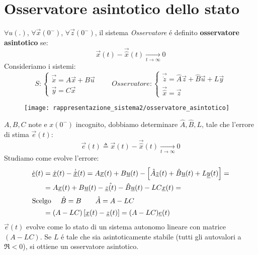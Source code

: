 \documentclass[../main.tex]{subfiles}
\begin{document}
	\section{Osservatore asintotico dello stato}
		$ \forall u(.) $, $ \forall \vec x(0^{-}) $, $ \forall \vec z(0^{-}) $, il sistema \textit{Osservatore} \'e definito \textbf{osservatore asintotico} se:
		\[
			\vec x(t) - \vec{\hat x}(t) \underset{t \rightarrow \infty}{\longrightarrow} 0
		\]
		Consideriamo i sistemi:
		\[
			S:
			\begin{cases}
				\vec{\dot x} = A \vec x + B \vec u\\
				\vec y = C \vec x
			\end{cases}
			\qquad
			Osservatore:
			\begin{cases}
				\vec{\dot z} = \hat A \vec z + \hat B \vec u + L \vec y\\
				\vec{\hat x} = \vec z
			\end{cases}
		\]
		
		\begin{figure}[H]
			\centering\texttt{[image: rappresentazione\_sistema2/osservatore\_asintotico]}
		\end{figure}
		
		$ A, B, C $ note e $ x(0^{-}) $ incognito, dobbiamo determinare $ \hat A, \hat B, L $, tale che l'errore di stima $ \vec e(t) $:
		\[
			\vec e(t) \triangleq \vec x(t) - \vec{\hat x}(t) \underset{t \rightarrow \infty}{\longrightarrow} 0
		\]
		Studiamo come evolve l'errore:
		\begin{align*}
			\dot{\vec e}(t) &= \vec{\dot x}(t) - \dot{\vec{\hat{x}}}(t) = A \vec x(t) + B \vec u(t) - \left[ \hat A \vec z(t) + \hat B \vec u(t) + L \vec y(t) \right] =
			\\
			&= A \vec x(t) + B \vec u(t) - \hat{\vec z(t)} - \hat B \vec u(t) - LC \vec x(t) =
			\\\intertext{Scelgo $ \quad \hat B = B \qquad \hat A = A - LC $}
			&= (A-LC) \left[ \vec x(t) - \vec z(t) \right] = (A-LC) \vec e(t)			
		\end{align*}
		$ \vec e(t) $ evolve come lo stato di un sistema autonomo lineare con matrice $ (A-LC) $. Se $ L $ \'e tale che sia asintoticamente stabile (tutti gli autovalori a $ \Re < 0 $), si ottiene un osservatore asintotico.
		
\end{document}
